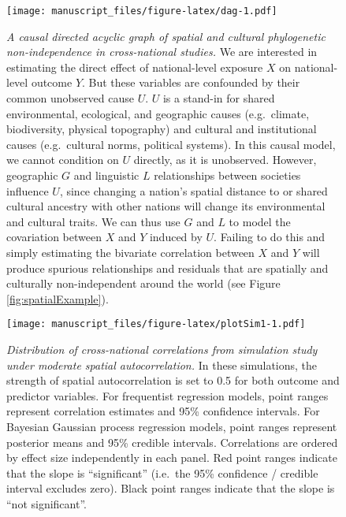 \documentclass[
  english,
  man,floatsintext]{apa6}
\begin{document}
\begin{appendix}
\begin{figure}
\centering
\texttt{[image: manuscript\_files/figure-latex/dag-1.pdf]}
\caption{\label{fig:dag}\emph{A causal directed acyclic graph of spatial and
cultural phylogenetic non-independence in cross-national studies.} We
are interested in estimating the direct effect of national-level
exposure \(X\) on national-level outcome \(Y\). But these variables are
confounded by their common unobserved cause \(U\). \(U\) is a stand-in
for shared environmental, ecological, and geographic causes
(e.g.~climate, biodiversity, physical topography) and cultural and
institutional causes (e.g.~cultural norms, political systems). In this
causal model, we cannot condition on \(U\) directly, as it is
unobserved. However, geographic \(G\) and linguistic \(L\) relationships
between societies influence \(U\), since changing a nation's spatial
distance to or shared cultural ancestry with other nations will change
its environmental and cultural traits. We can thus use \(G\) and \(L\)
to model the covariation between \(X\) and \(Y\) induced by \(U\).
Failing to do this and simply estimating the bivariate correlation
between \(X\) and \(Y\) will produce spurious relationships and
residuals that are spatially and culturally non-independent around the
world (see Figure \ref{fig:spatialExample}).}
\end{figure}

\newpage













\begin{figure}
\centering
\texttt{[image: manuscript\_files/figure-latex/plotSim1-1.pdf]}
\caption{\label{fig:plotSim1}\emph{Distribution of cross-national correlations
from simulation study under moderate spatial autocorrelation.} In these
simulations, the strength of spatial autocorrelation is set to 0.5 for
both outcome and predictor variables. For frequentist regression models,
point ranges represent correlation estimates and 95\% confidence
intervals. For Bayesian Gaussian process regression models, point ranges
represent posterior means and 95\% credible intervals. Correlations are
ordered by effect size independently in each panel. Red point ranges
indicate that the slope is ``significant'' (i.e.~the 95\% confidence /
credible interval excludes zero). Black point ranges indicate that the
slope is ``not significant''.}
\end{figure}


\end{appendix}
\end{document}
